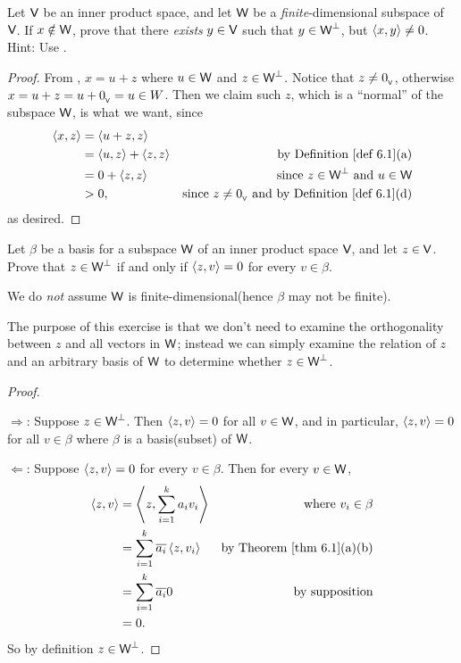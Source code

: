 \begin{exercise} \label{exercise 6.2.6}
Let \(\textsf{V}\) be an inner product space, and let \(\textsf{W}\) be a \emph{finite}-dimensional subspace of \(\textsf{V}\).
If \(x \notin \textsf{W}\), prove that there \emph{exists} \(y \in \textsf{V}\) such that \(y \in \textsf{W}^{\perp}\), but \(\left< x, y \right> \ne 0\).
Hint: Use .
\end{exercise}

\begin{proof}
From , \(x = u + z\) where \(u \in \textsf{W}\) and \(z \in \textsf{W}^{\perp}\).
Notice that \(z \ne 0_{_{\textsf{V}}}\), otherwise \(x = u + z = u + 0_{_{\textsf{V}}} = u \in W\).
Then we claim such \(z\), which is a ``normal'' of the subspace \(\textsf{W}\), is what we want, since
\begin{align*}
    \LG x, z \RG & = \LG u + z, z \RG \\
        & = \LG u, z \RG + \LG z, z \RG & \text{by \DEF{6.1}(a)} \\
        & = 0 + \LG z, z \RG & \text{since \(z \in \W^{\perp}\) and \(u \in \W\)} \\
        & > 0, & \text{since \(z \ne \OV\) and by \DEF{6.1}(d)}
\end{align*}
as desired.
\end{proof}

\begin{exercise} \label{exercise 6.2.7}
Let \(\beta\) be a basis for a subspace \(\textsf{W}\) of an inner product space \(\textsf{V}\), and let \(z \in \textsf{V}\).
Prove that \(z \in \textsf{W}^{\perp}\) if and only if \(\left< z, v \right> = 0\) for every \(v \in \beta\).
\end{exercise}

\begin{note}
We do \emph{not} assume \(\textsf{W}\) is finite-dimensional(hence \(\beta\) may not be finite).

The purpose of this exercise is that we don't need to examine the orthogonality between \(z\) and all vectors in \(\textsf{W}\);
instead we can simply examine the relation of \(z\) and an arbitrary basis of \(\textsf{W}\) to determine whether \(z \in \textsf{W}^{\perp}\).
\end{note}

\begin{proof} \ 

\(\Longrightarrow\): Suppose \(z \in \textsf{W}^{\perp}\).
Then \(\left< z, v \right> = 0\) for all \(v \in \textsf{W}\), and in particular, \(\left< z, v \right> = 0\) for all \(v \in \beta\) where \(\beta\) is a basis(subset) of \(\textsf{W}\).

\(\Longleftarrow\): Suppose \(\left< z, v \right> = 0\) for every \(v \in \beta\).
Then for every \(v \in \textsf{W}\),
\begin{align*}
    \LG z, v \RG & = \LG z, \sum_{i = 1}^k a_i v_i \RG & \text{where \(v_i \in \beta\)} \\
        & = \sum_{i = 1}^k \conjugatet{a_i} \LG z, v_i \RG & \text{by \THM{6.1}(a)(b)} \\
        & = \sum_{i = 1}^k \conjugatet{a_i} 0 & \text{by supposition} \\
        & = 0.
\end{align*}
So by definition \(z \in \textsf{W}^{\perp}\).
\end{proof}

